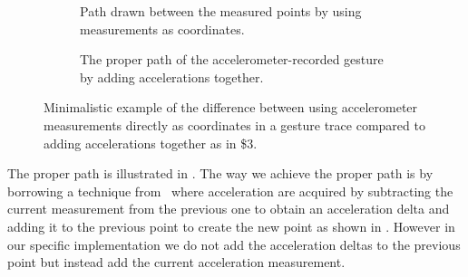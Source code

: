 \begin{figure}[h]
    \begin{subfigure}{.5\linewidth}
    \caption{Path drawn between the measured points by using measurements as coordinates.}
\label{fig:accelerometerpath}
    \end{subfigure}
    \begin{subfigure}{.5\linewidth}
    \caption{The proper path of the accelerometer-recorded gesture by adding accelerations together.}
\label{fig:acceleromterpath-proper}
    \end{subfigure}
\caption{Minimalistic example of the difference between using accelerometer measurements directly as coordinates in a gesture trace compared to adding accelerations together as in \$3.}
\end{figure}

The proper path is illustrated in .
The way we achieve the proper path is by borrowing a technique from~\cite{threedollar} where acceleration are acquired by subtracting the current measurement from the previous one to obtain an acceleration delta and adding it to the previous point to create the new point as shown in .
However in our specific implementation we do not add the acceleration deltas to the previous point but instead add the current acceleration measurement.
